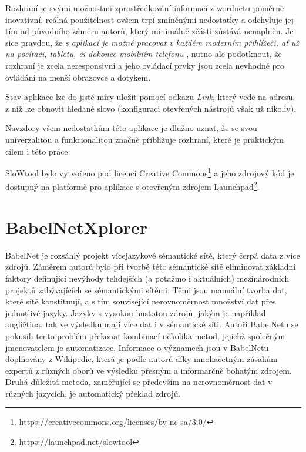 \documentclass[a4paper, 11pt, oneside]{book}
\begin{document}
				Rozhraní je svými možnostmi zprostředkování informací z wordnetu poměrně inovativní, reálná použitelnost ovšem trpí zmíněnými nedostatky a odchyluje jej tím od původního záměru autorů, který minimálně zčásti zůstává nenaplněn. Je sice pravdou, že \textit{s aplikací je možné pracovat v každém moderním přihlížeči, ať už na počítači, tabletu, či dokonce mobilním telefonu} \parencite{fivser2011visualizing}, nutno ale podotknout, že rozhraní je zcela neresponsivní a jeho ovládací prvky jsou zcela nevhodné pro ovládání na menší obrazovce a dotykem.

				Stav aplikace lze do jisté míry uložit pomocí odkazu \textit{Link}, který vede na adresu, z níž lze obnovit hledané slovo (konfiguraci otevřených nástrojů však už nikoliv).

				Navzdory všem nedostatkům této aplikace je dlužno uznat, že se svou univerzalitou a funkcionalitou značně přibližuje rozhraní, které je praktickým cílem i této práce.

				SloWtool bylo vytvořeno pod licencí Creative Commons\footnote{\url{https://creativecommons.org/licenses/by-nc-sa/3.0/}} a jeho zdrojový kód je dostupný na platformě pro aplikace s otevřeným zdrojem Launchpad\footnote{\url{https://launchpad.net/slowtool}}.

			\section{BabelNetXplorer}
			\label{vis:babel}

				BabelNet je rozsáhlý projekt vícejazykové sémantické sítě, který čerpá data z více zdrojů. Záměrem autorů bylo při tvorbě této sémantické sítě 
				eliminovat základní faktory definující nevýhody tehdejších (a potažmo i aktuálních) mezinárodních projektů zabývajících se sémantickými sítěmi. Těmi jsou manuální tvorba dat, které sítě konstituují, a s tím související nerovnoměrnost množství dat přes jednotlivé jazyky. Jazyky s vysokou hustotou zdrojů, jakým je například angličtina, tak ve výsledku mají více dat i v sémantické síti. Autoři BabelNetu se pokusili tento problém překonat kombinací několika metod, jejichž společným jmenovatelem je automatizace. Informace o významech jsou v BabelNetu doplňovány z Wikipedie, která je podle autorů díky mnohačetným zásahům expertů z různých oborů ve výsledku přesným a informarčně bohatým zdrojem. Druhá důležitá metoda, zaměřující se především na nerovnoměrnost dat v různých jazycích, je automatický překlad zdrojů. \parencite{navigli2010babelnet}
\end{document}
